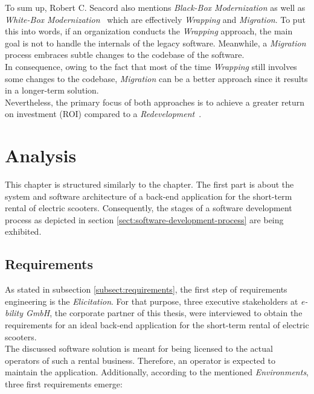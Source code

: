 \documentclass[12pt,a4paper,twoside]{report}
\begin{document}
To sum up, Robert C. Seacord also mentions \textit{Black-Box Modernization} as well as
\textit{White-Box Modernization}~\cite{seacord-modernizing-legacy} which are
effectively \textit{Wrapping} and \textit{Migration}. To put this into words,
if an organization conducts the \textit{Wrapping} approach, the main goal is not
to handle the internals of the legacy software.
Meanwhile, a \textit{Migration} process embraces subtle changes to the codebase of the software.\\
In consequence, owing to the fact that most of the time \textit{Wrapping} still
involves some changes to the codebase, \textit{Migration} can be a better
approach since it results in a longer-term solution.\\
Nevertheless, the primary focus of both approaches is to achieve a greater
return on investment (ROI) compared to a \textit{Redevelopment}~\cite{tilley-perspectives-reengineering}.



\chapter{Analysis} \label{chap:analysis}


This chapter is structured similarly to the \textit{}
chapter. The first part is about the system and software architecture of
a back-end application for the short-term rental of electric scooters.
Consequently, the stages of a software development process as depicted
in section \ref{sect:software-development-process} are being exhibited.


\section{Requirements} \label{subsect:app-requirements}

As stated in subsection \ref{subsect:requirements}, the first step of
requirements engineering is the \textit{Elicitation}.
For that purpose, three executive stakeholders
at \textit{e-bility GmbH}, the corporate partner of this thesis, were interviewed
to obtain the requirements for an ideal back-end application for the
short-term rental of electric scooters.\\
The discussed software solution is meant for being licensed to
the actual operators of such a rental business. Therefore, an operator
is expected to maintain the application. Additionally, according to the
mentioned \textit{Environments}, three first requirements emerge:
\end{document}
